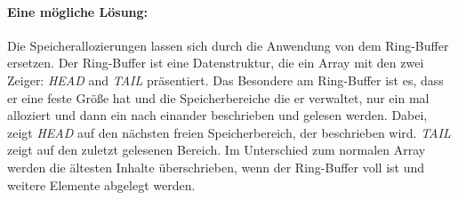 \paragraph*{Eine mögliche Lösung:}
Die Speicherallozierungen lassen sich durch die Anwendung von dem Ring-Buffer
ersetzen. Der Ring-Buffer ist eine Datenstruktur, die ein Array mit den zwei
Zeiger: \emph{HEAD} and \emph{TAIL} präsentiert. Das Besondere am Ring-Buffer
ist es, dass er eine feste Größe hat und die Speicherbereiche die er verwaltet,
nur ein mal alloziert und dann ein nach einander beschrieben und gelesen
werden. Dabei, zeigt \emph{HEAD} auf den nächsten freien Speicherbereich, der
beschrieben wird. \emph{TAIL} zeigt auf den zuletzt gelesenen Bereich. Im
Unterschied zum normalen Array werden die ältesten Inhalte überschrieben, wenn
der Ring-Buffer voll ist und weitere Elemente abgelegt werden.
%
